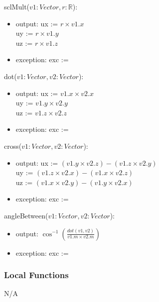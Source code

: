 \documentclass[12pt, titlepage]{article}
\begin{document}
\noindent sclMult($v1:Vector, r:\mathbb{R}$):
\begin{itemize}
	\item output: 
	ux := $r \times v1.x$ \\
	uy := $r \times v1.y$ \\
	uz := $r \times v1.z$ \\	
	\item exception: exc := \\
\end{itemize}


\noindent dot($v1:Vector, v2:Vector$):
\begin{itemize}
	\item output: 
	ux := $v1.x \times v2.x$ \\
	uy := $v1.y \times v2.y$ \\
	uz := $v1.z \times v2.z$ \\
	\item exception: exc := \\
\end{itemize}

\noindent cross($v1:Vector, v2:Vector$):
\begin{itemize}
	\item output: 
	ux := $(v1.y \times v2.z) - (v1.z \times v2.y)$  \\
	uy := $(v1.z \times v2.x) - (v1.x \times v2.z)$  \\
	uz := $(v1.x \times v2.y) - (v1.y \times v2.x)$  \\
	\item exception: exc := \\
\end{itemize}

\noindent angleBetween($v1:Vector, v2:Vector$):
\begin{itemize}
	\item output: $\cos^{-1}(\frac{dot(v1, v2)}{v1.m \times v2.m})$
	\item exception: exc := \\
\end{itemize}

\subsubsection{Local Functions}
N/A
\end{document}
